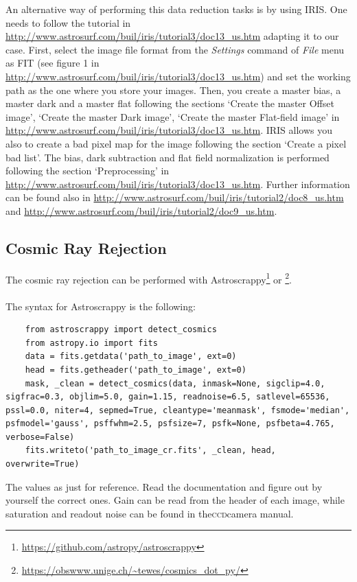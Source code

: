 \documentclass[a4paper, 11pt, fleqn]{memoir}
\begin{document}
An alternative way of performing this data reduction tasks is by using IRIS.
One needs to follow the tutorial in \url{http://www.astrosurf.com/buil/iris/tutorial3/doc13_us.htm} adapting it to our case.
First, select the image file format from the \textit{Settings} command of \textit{File} menu as FIT (see figure 1 in \url{http://www.astrosurf.com/buil/iris/tutorial3/doc13_us.htm}) and set the working path as the one where you store your images.
Then, you create a master bias, a master dark and a master flat following the sections `Create the master Offset image', `Create the master Dark image', `Create the master Flat-field image' in \url{http://www.astrosurf.com/buil/iris/tutorial3/doc13_us.htm}.
IRIS allows you also to create a bad pixel map for the image following the section `Create a pixel bad list'.
The bias, dark subtraction and flat field normalization is performed following the section `Preprocessing' in \url{http://www.astrosurf.com/buil/iris/tutorial3/doc13_us.htm}.
Further information can be found also in \url{http://www.astrosurf.com/buil/iris/tutorial2/doc8_us.htm} and \url{http://www.astrosurf.com/buil/iris/tutorial2/doc9_us.htm}.

\subsection{Cosmic Ray Rejection}

The cosmic ray rejection can be performed with Astroscrappy\footnote{\url{https://github.com/astropy/astroscrappy}} or \footnote{\url{https://obswww.unige.ch/~tewes/cosmics_dot_py/}}.

\paragraph{}
The syntax for Astroscrappy is the following:
\begin{verbatim}
    from astroscrappy import detect_cosmics
    from astropy.io import fits
    data = fits.getdata('path_to_image', ext=0)
    head = fits.getheader('path_to_image', ext=0)
    mask, _clean = detect_cosmics(data, inmask=None, sigclip=4.0, sigfrac=0.3, objlim=5.0, gain=1.15, readnoise=6.5, satlevel=65536, pssl=0.0, niter=4, sepmed=True, cleantype='meanmask', fsmode='median', psfmodel='gauss', psffwhm=2.5, psfsize=7, psfk=None, psfbeta=4.765, verbose=False)
    fits.writeto('path_to_image_cr.fits', _clean, head, overwrite=True)
\end{verbatim}
The values as just for reference.
Read the documentation and figure out by yourself the correct ones.
Gain can be read from the header of each image, while saturation and readout noise can be found in the\textsc{ccd}camera manual.
\end{document}
